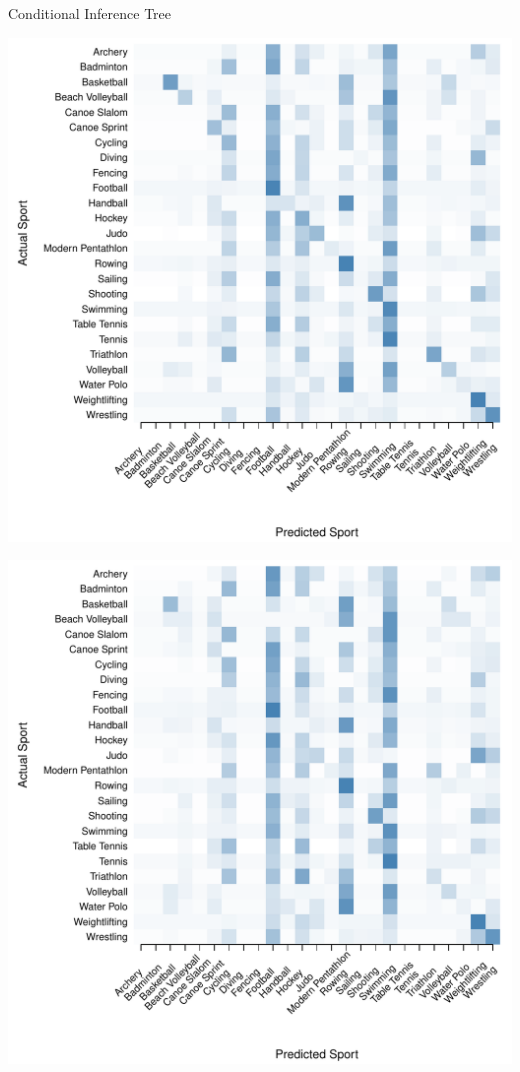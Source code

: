 \begin{center}
    Conditional Inference Tree \\

  \begin{minipage}{0.45\textwidth}
    \begin{center}
      \includegraphics[scale=0.27]{../graphics/sportCIT-trn.pdf}
    \end{center}
  \end{minipage}
  \hspace{0.05\textwidth}
  \begin{minipage}{0.45\textwidth}
    \begin{center}
      \includegraphics[scale=0.27]{../graphics/sportCIT-tst.pdf}

\end{center}
\end{minipage}
\end{center}
